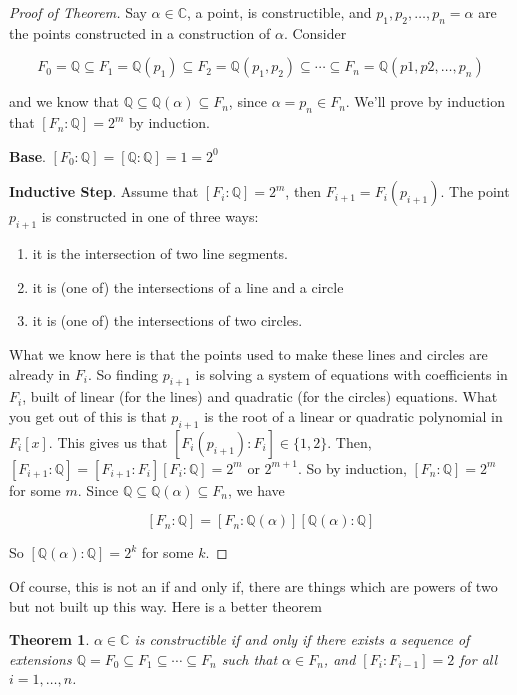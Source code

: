 \documentclass[12pt]{article}
\def\Q{{\mathbb Q}}
\def\C{{\mathbb C}}
\newtheorem{theorem}{Theorem}
\theoremstyle{remark}
\theoremstyle{remark}
\theoremstyle{remark}
\theoremstyle{remark}
\theoremstyle{remark}
\begin{document}
\begin{proof}[Proof of Theorem]
  Say $\alpha \in \C$, a point, is constructible, and $p_1, p_2, \dots, p_n =
  \alpha$ are the points constructed in a construction of $\alpha$. Consider 

  \[
    F_0 = \Q \subseteq F_1 = \Q(p_1) \subseteq F_2 = \Q(p_1, p_2) \subseteq \cdots \subseteq F_n = \Q(p1, p2, \dots, p_n)
  \]

  and we know that $\Q \subseteq \Q(\alpha) \subseteq F_n$, since $\alpha = p_n
  \in F_n$. We'll prove by induction that $[F_n : \Q] = 2^m$ by induction.

  {\bf Base}. $[F_0 : \Q] = [\Q : \Q] = 1 = 2^0$

  {\bf Inductive Step}. Assume that $[F_i : \Q] = 2^m$, then $F_{i + 1} =
  F_i(p_{i + 1})$. The point $p_{i + 1}$ is constructed in one of three ways:

  \begin{enumerate}
    \item it is the intersection of two line segments.
    \item it is (one of) the intersections of a line and a circle
    \item it is (one of) the intersections of two circles.
  \end{enumerate}

  What we know here is that the points used to make these lines and circles are
  already in $F_i$. So finding $p_{i + 1}$ is solving a system of equations with
  coefficients in $F_i$, built of linear (for the lines) and quadratic (for the
  circles) equations. What you get out of this is that $p_{i + 1}$ is the root
  of a linear or quadratic polynomial in $F_i[x]$. This gives us that $[F_i(p_{i
  + 1}) : F_i] \in \{1, 2\}$. Then, $[F_{i + 1} : \Q] = [F_{i + 1} : F_i][F_i :
  \Q] = 2^m$ or $2^{m + 1}$. So by induction, $[F_n : \Q] = 2^m$ for some $m$.
  Since $\Q \subseteq \Q(\alpha) \subseteq F_n$, we have

  \[
    [F_n : \Q] = [F_n : \Q(\alpha)][\Q(\alpha) : \Q]
  \]

  So $[\Q(\alpha) : \Q] = 2^k$ for some $k$.
\end{proof}

Of course, this is not an if and only if, there are things which are powers of
two but not built up this way. Here is a better theorem

\begin{theorem}
  $\alpha \in \C$ is constructible if and only if there exists a sequence of
  extensions $\Q = F_0 \subseteq F_1 \subseteq \cdots \subseteq F_n$ such that
  $\alpha \in F_n$, and $[F_i : F_{i - 1}] = 2$ for all $i = 1, \dots, n$.
\end{theorem}
\end{document}
